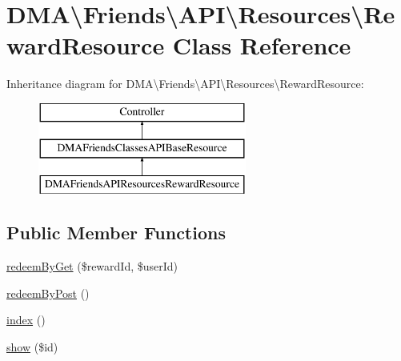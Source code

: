 \hypertarget{classDMA_1_1Friends_1_1API_1_1Resources_1_1RewardResource}{}\section{D\+M\+A\textbackslash{}Friends\textbackslash{}A\+P\+I\textbackslash{}Resources\textbackslash{}Reward\+Resource Class Reference}
\label{classDMA_1_1Friends_1_1API_1_1Resources_1_1RewardResource}
Inheritance diagram for D\+M\+A\textbackslash{}Friends\textbackslash{}A\+P\+I\textbackslash{}Resources\textbackslash{}Reward\+Resource\+:\begin{figure}[H]
\begin{center}
\leavevmode
\includegraphics[height=3.000000cm]{da/d5c/classDMA_1_1Friends_1_1API_1_1Resources_1_1RewardResource}
\end{center}
\end{figure}
\subsection*{Public Member Functions}
\begin{DoxyCompactItemize}
\item 
\hyperlink{classDMA_1_1Friends_1_1API_1_1Resources_1_1RewardResource_a65e7225c16bafe1a2ef96e7ccf88e85e}{redeem\+By\+Get} (\$reward\+Id, \$user\+Id)
\item 
\hyperlink{classDMA_1_1Friends_1_1API_1_1Resources_1_1RewardResource_a5979a6696b2dbd4561043a44508f583d}{redeem\+By\+Post} ()
\item 
\hyperlink{classDMA_1_1Friends_1_1API_1_1Resources_1_1RewardResource_abe59a1aef1f97484fa48a8d4b9ec9777}{index} ()
\item 
\hyperlink{classDMA_1_1Friends_1_1API_1_1Resources_1_1RewardResource_af029b99cc507bb3cd5cfb29804ed2071}{show} (\$id)
\end{DoxyCompactItemize}
